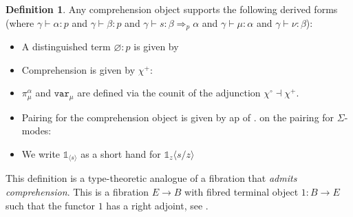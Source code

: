 \documentclass[10pt]{article}
\theoremstyle{definition}
\newtheorem{definition}{Definition}
\let\emptyset\varnothing
\newcommand\dsd[1]{\ensuremath{\mathsf{#1}}}
\newcommand{\yields}{\vdash}
\newcommand{\tcell}{\Rightarrow}
\newcommand{\app}[2]{\ensuremath{#1 \: #2}}
\newcommand{\fst}[1]{\app{\dsd{fst}}{#1}}
\newcommand{\snd}[1]{\app{\dsd{snd}}{#1}}
\newcommand\TermTwoT[5]{\ensuremath{#1 \vdash {#2} : #3 \tcell_{#5} #4}}
\newcommand\TrPlus[2]{\ensuremath{{#1}^+(#2)}}
\newcommand\El[2]{\mathcal{T}_{#1}(#2)}
\newcommand\ApEl[2]{\mathcal{T}_{#1}\langle#2\rangle}
\newcommand\bdot[0]{\mathbin{.}}
\newcommand\ap[2]{\ensuremath{#1 \langle #2 \rangle }}
\newcommand\ApPlus[2]{\ensuremath{{#1}^+ \langle #2 \rangle }}
\newcommand\One{\ensuremath{\mathds{1}}}
\newcommand\var[1]{\ensuremath{\mathtt{var}_{#1}}}
\newcommand\ApOne[1]{\ensuremath{\One_{\langle {#1} \rangle }}}
\begin{document}
\begin{definition}
Any comprehension object supports the following derived forms (where $\gamma \yields \alpha : p$
and $\gamma \yields \beta : p$ and
$\TermTwoT{\gamma}{s}{\beta}{\alpha}{p}$ and $\gamma \yields \mu :
\alpha$ and $\gamma \yields \nu : \beta$):
  \begin{itemize}
  \item A distinguished term $\emptyset : p$ is given by
  \item Comprehension is given by $\chi^+$:
  \item $\pi^\alpha_\mu$ and $\var{\mu}$ are defined via the counit of the adjunction $\chi^\circ \dashv \chi^+$.
  \item Pairing for the comprehension object is given by ap of
  $.$ on the pairing for $\Sigma$-modes:
  \item We write $\ApOne{s}$ as a short hand for $\ap{\One_z}{s/z}$
  \end{itemize}
\end{definition}

This definition is a type-theoretic analogue of a fibration that \emph{admits comprehension}. This is a fibration $E \to B$ with fibred terminal object $1 : B \to E$ such that the functor $1$ has a right adjoint, see .
\end{document}
